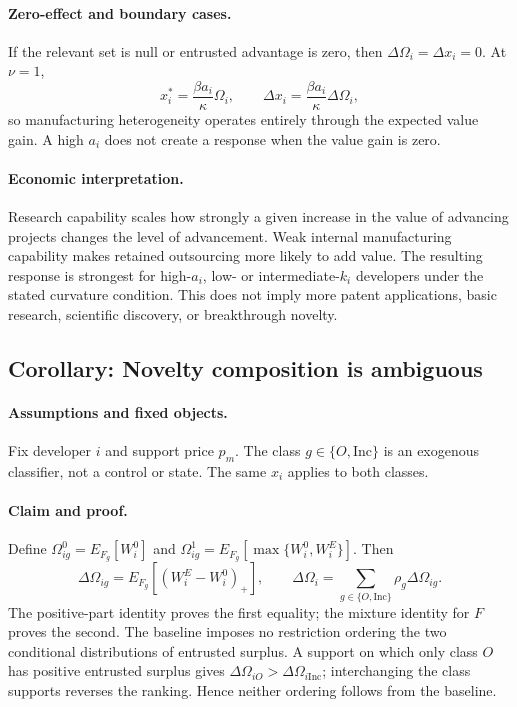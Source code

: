 \paragraph{Zero-effect and boundary cases.}
If the relevant set is null or entrusted advantage is zero, then
\(\Delta\Omega_i=\Delta x_i=0\). At \(\nu=1\),
\[
  x_i^*=\frac{\beta a_i}{\kappa}\Omega_i,
  \qquad
  \Delta x_i=\frac{\beta a_i}{\kappa}\Delta\Omega_i,
\]
so manufacturing heterogeneity operates entirely through the expected value
gain. A high \(a_i\) does not create a response when the value gain is zero.

\paragraph{Economic interpretation.}
Research capability scales how strongly a given increase in the value of
advancing projects changes the level of advancement. Weak internal
manufacturing capability makes retained outsourcing more likely to add value.
The resulting response is strongest for high-\(a_i\), low- or
intermediate-\(k_i\) developers under the stated curvature condition. This
does not imply more patent applications, basic research, scientific
discovery, or breakthrough novelty.

\subsection{Corollary: Novelty composition is ambiguous}
\label{cor:p08-novelty}

\paragraph{Assumptions and fixed objects.}
Fix developer \(i\) and support price \(p_m\). The class
\(g\in\{O,\mathrm{Inc}\}\) is an exogenous classifier, not a control or state.
The same \(x_i\) applies to both classes.

\paragraph{Claim and proof.}
Define
\(\Omega_{ig}^0=E_{F_g}[W_i^0]\) and
\(\Omega_{ig}^1=E_{F_g}[\max\{W_i^0,W_i^E\}]\). Then
\begin{equation}
  \Delta\Omega_{ig}
  =
  E_{F_g}
  \left[
    \left(W_i^E-W_i^0\right)_+
  \right],
  \qquad
  \Delta\Omega_i
  =
  \sum_{g\in\{O,\mathrm{Inc}\}}\rho_g\Delta\Omega_{ig}.
  \label{eq:p08-class-gain}
\end{equation}
The positive-part identity proves the first equality; the mixture identity
for \(F\) proves the second. The baseline imposes no restriction ordering the
two conditional distributions of entrusted surplus. A support on which only
class \(O\) has positive entrusted surplus gives
\(\Delta\Omega_{iO}>\Delta\Omega_{i\mathrm{Inc}}\); interchanging the class
supports reverses the ranking. Hence neither ordering follows from the
baseline.

